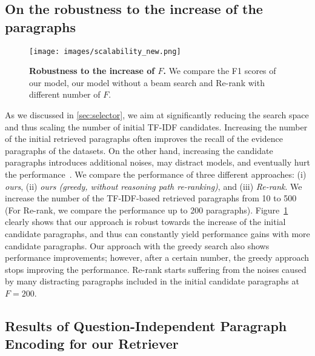 \subsection{On the robustness to the increase of the paragraphs} 
\label{subsec:appendix_robust}

\begin{figure}[t!]
  \centering
  \texttt{[image: images/scalability\_new.png]}
  \caption{{\bf Robustness to the increase of $F$.} We compare the F1 scores of our model, our model without a beam search and Re-rank with different number of $F$. }
  \label{img:robustness}
\end{figure}

As we discussed in \ref{sec:selector}, we aim at significantly reducing the search space and thus scaling the number of initial TF-IDF candidates.
Increasing the number of the initial retrieved paragraphs often improves the recall of the evidence paragraphs of the datasets.
On the other hand, increasing the candidate paragraphs introduces additional noises, may distract models, and eventually hurt the performance~\citep{kratzwald-feuerriegel-2018-adaptive}.
We compare the performance of three different approaches: (i)  {\it ours}, (ii) {\it ours (greedy, without reasoning path re-ranking)}, and (iii) {\it Re-rank}. 
We increase the number of the TF-IDF-based retrieved paragraphs from 10 to 500 (For Re-rank, we compare the performance up to 200 paragraphs). 
Figure~\ref{img:robustness} clearly shows that our approach is robust towards the increase of the initial candidate paragraphs, and thus can constantly yield performance gains with more candidate paragraphs.
Our approach with the greedy search also shows performance improvements; however, after a certain number, the greedy approach stops improving the performance.
Re-rank starts suffering from the noises caused by many distracting paragraphs included in the initial candidate paragraphs at $F=200$.

\subsection{Results of Question-Independent Paragraph Encoding for our Retriever}
\label{subsec:appendix_query_independent_results}

